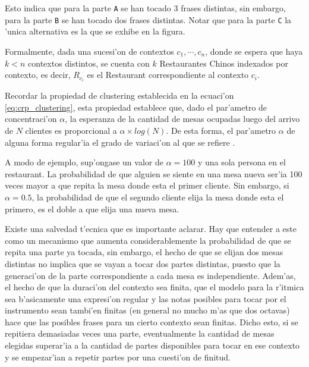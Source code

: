 \begin{imagen}
    \width{10cm}
\end{imagen}


Esto indica que para la parte \texttt{A} se han tocado 3 frases distintas, sin embargo, para la parte \texttt{B} se han tocado dos frases distintas. 
Notar que para la parte \texttt{C} la 'unica alternativa es la que se exhibe en la figura.

Formalmente, dada una sucesi'on de contextos $c_1, \cdots, c_n$, donde se espera que haya $k<n$ contextos distintos, se cuenta con $k$ Restaurantes Chinos indexados por contexto,
es decir, $R_{c_i}$ es el Restaurant correspondiente al contexto $c_i$. 

Recordar la propiedad de clustering establecida en la ecuaci'on \ref{eq:crp_clustering}, esta propiedad 
establece que, dado el par'ametro de concentraci'on $\alpha$, la esperanza de la cantidad de mesas ocupadas luego del arrivo de $N$ clientes es proporcional a $\alpha\times log(N)$.
De esta forma, el par'ametro $\alpha$ de alguna forma regular'ia el grado de variaci'on al que se refiere \cite{Deliege90}. 

A modo de ejemplo, sup'ongase un valor de $\alpha=100$ y una sola persona
en el restaurant. La probabilidad de que alguien se siente en una mesa nueva ser'ia 100 veces mayor a que repita la mesa donde esta el primer cliente. Sin embargo, si $\alpha=0.5$, 
la probabilidad de que el segundo cliente elija la mesa donde esta el primero, es el doble a que elija una nueva mesa.

Existe una salvedad t'ecnica que es importante aclarar. Hay que entender a este como un mecanismo que aumenta considerablemente la probabilidad de que se repita una parte ya tocada,
sin embargo, el hecho de que se elijan dos mesas distintas no implica que se vayan a tocar dos partes distintas, puesto que la generaci'on de la parte correspondiente
a cada mesa es independiente. Adem'as, el hecho de que la duraci'on del contexto sea finita, que el modelo para la r'itmica sea b'asicamente una expresi'on regular y 
las notas posibles para tocar por el instrumento sean tambi'en finitas (en general no mucho m'as que dos octavas) hace que las posibles frases para un cierto contexto
sean finitas. Dicho esto, si se repitiera demasiadas veces una parte, eventualmente la cantidad de mesas elegidas superar'ia a la cantidad de partes disponibles
para tocar en ese contexto y se empezar'ian a repetir partes por una cuesti'on de finitud. 

